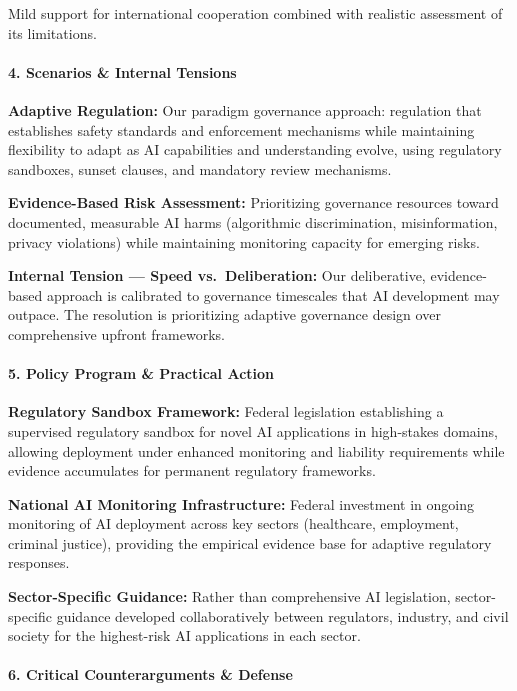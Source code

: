 Mild support for international cooperation combined with realistic
assessment of its limitations.

\paragraph{4. Scenarios \& Internal
Tensions}\label{scenarios-internal-tensions-29}

\textbf{Adaptive Regulation:} Our paradigm governance approach:
regulation that establishes safety standards and enforcement mechanisms
while maintaining flexibility to adapt as AI capabilities and
understanding evolve, using regulatory sandboxes, sunset clauses, and
mandatory review mechanisms.

\textbf{Evidence-Based Risk Assessment:} Prioritizing governance
resources toward documented, measurable AI harms (algorithmic
discrimination, misinformation, privacy violations) while maintaining
monitoring capacity for emerging risks.

\textbf{Internal Tension --- Speed vs.~Deliberation:} Our deliberative,
evidence-based approach is calibrated to governance timescales that AI
development may outpace. The resolution is prioritizing adaptive
governance design over comprehensive upfront frameworks.

\paragraph{5. Policy Program \& Practical
Action}\label{policy-program-practical-action-29}

\textbf{Regulatory Sandbox Framework:} Federal legislation establishing
a supervised regulatory sandbox for novel AI applications in high-stakes
domains, allowing deployment under enhanced monitoring and liability
requirements while evidence accumulates for permanent regulatory
frameworks.

\textbf{National AI Monitoring Infrastructure:} Federal investment in
ongoing monitoring of AI deployment across key sectors (healthcare,
employment, criminal justice), providing the empirical evidence base for
adaptive regulatory responses.

\textbf{Sector-Specific Guidance:} Rather than comprehensive AI
legislation, sector-specific guidance developed collaboratively between
regulators, industry, and civil society for the highest-risk AI
applications in each sector.

\paragraph{6. Critical Counterarguments \&
Defense}\label{critical-counterarguments-defense-29}

